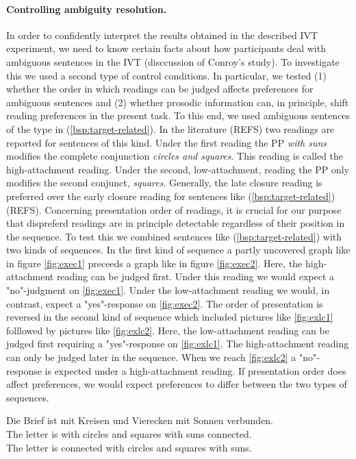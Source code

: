 \documentclass[fleqn,reqno,10pt,draft]{article}
\begin{document}
\paragraph{Controlling ambiguity resolution.} In order to confidently
interpret the results obtained in the described IVT experiment, we
need to know certain facts about how participants deal with ambiguous
sentences in the IVT (disccussion of Conroy's study). To investigate
this we used a second type of control conditions. In particular, we
tested (1) whether the order in which readings can be judged affects
preferences for ambiguous sentences and (2) whether prosodic
information can, in principle, shift reading preferences in the
present task. To this end, we used ambiguous sentences of the type in
(\ref{bsp:target-related}). In the literature (REFS) two readings are
reported for sentences of this kind. Under the first reading the PP
{\it with suns} modifies the complete conjunction {\it circles and
  squares}. This reading is called the high-attachment reading. Under
the second, low-attachment, reading the PP only modifies the second
conjunct, {\it squares}. Generally, the late closure reading is
preferred over the early closure reading for sentences like
(\ref{bsp:target-related}) (REFS). Concerning presentation order of
readings, it is crucial for our purpose that dispreferd readings are
in principle detectable regardless of their position in the
sequence. To test this we combined sentences like
(\ref{bsp:target-related}) with two kinds of sequences. In the first
kind of sequence a partly uncovered graph like in figure
\ref{fig:exec1} preceeds a graph like in figure \ref{fig:exec2}. Here,
the high-attachment reading can be judged first. Under this reading we
would expect a "no"-judgment on \ref{fig:exec1}. Under the
low-attachment reading we would, in contrast, expect a "yes"-response
on \ref{fig:exec2}. The order of presentation is reversed in the
second kind of sequence which included pictures like \ref{fig:exlc1}
folllowed by pictures like \ref{fig:exlc2}. Here, the low-attachment
reading can be judged first requiring a "yes"-response on
\ref{fig:exlc1}. The high-attachment reading can only be judged later
in the sequence. When we reach \ref{fig:exlc2} a "no"-response is
expected under a high-attachment reading. If presentation order does
affect preferences, we would expect preferences to differ between the
two types of sequences.

\begin{exe}
\ex \gll \label{bsp:target-related} Die Brief ist mit Kreisen und Vierecken mit Sonnen verbunden.\\
The letter is with circles and squares with suns connected.\\
The letter is connected with circles and squares with suns.
\end{exe}
\end{document}
